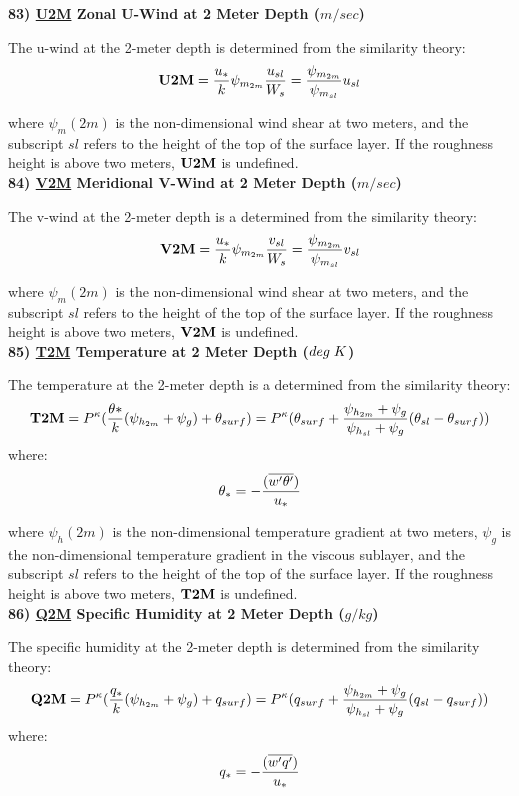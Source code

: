 \noindent
{\bf 83)  \underline {U2M}  Zonal U-Wind at 2 Meter Depth ($m/sec$) }

\noindent
The u-wind at the 2-meter depth is determined from the similarity theory:
\[
{\bf U2M} = {u_* \over k} \psi_{m_{2m}} {u_{sl} \over {W_s}} =
{ \psi_{m_{2m}} \over {\psi_{m_{sl}} }}u_{sl}
\]

\noindent
where $\psi_m(2m)$ is the non-dimensional wind shear at two meters, and the subscript
$sl$ refers to the height of the top of the surface layer. If the roughness height
is above two meters, ${\bf U2M}$ is undefined.
\\
 
\noindent
{\bf 84)  \underline {V2M}  Meridional V-Wind at 2 Meter Depth ($m/sec$) }

\noindent
The v-wind at the 2-meter depth is a determined from the similarity theory:
\[
{\bf V2M} = {u_* \over k} \psi_{m_{2m}} {v_{sl} \over {W_s}} =
{ \psi_{m_{2m}} \over {\psi_{m_{sl}} }}v_{sl}
\]

\noindent
where $\psi_m(2m)$ is the non-dimensional wind shear at two meters, and the subscript
$sl$ refers to the height of the top of the surface layer. If the roughness height
is above two meters, ${\bf V2M}$ is undefined.
\\
 
\noindent
{\bf 85)  \underline {T2M}  Temperature at 2 Meter Depth ($deg \hspace{.1cm} K$) }

\noindent
The temperature at the 2-meter depth is a determined from the similarity theory:
\[
{\bf T2M} = P^{\kappa} ({\theta* \over k} ({\psi_{h_{2m}}+\psi_g}) + \theta_{surf} ) = 
P^{\kappa}(\theta_{surf} + { {\psi_{h_{2m}}+\psi_g} \over {{\psi_{h_{sl}}+\psi_g}} }
(\theta_{sl} - \theta_{surf})) 
\]
where:
\[
\theta_* = - { (\overline{w^{\prime}\theta^{\prime}}) \over {u_*} }
\]

\noindent
where $\psi_h(2m)$ is the non-dimensional temperature gradient at two meters, $\psi_g$ is
the non-dimensional temperature gradient in the viscous sublayer, and the subscript
$sl$ refers to the height of the top of the surface layer. If the roughness height
is above two meters, ${\bf T2M}$ is undefined.
\\
 
\noindent
{\bf 86)  \underline {Q2M}  Specific Humidity at 2 Meter Depth ($g/kg$) }

\noindent
The specific humidity at the 2-meter depth is determined from the similarity theory:
\[
{\bf Q2M} = P^{\kappa} ({q_* \over k} ({\psi_{h_{2m}}+\psi_g}) + q_{surf} ) = 
P^{\kappa}(q_{surf} + { {\psi_{h_{2m}}+\psi_g} \over {{\psi_{h_{sl}}+\psi_g}} }
(q_{sl} - q_{surf})) 
\]
where:
\[
q_* = - { (\overline{w^{\prime}q^{\prime}}) \over {u_*} }
\]


